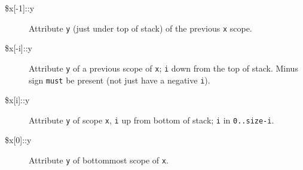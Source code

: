 \begin{description}
\item[\$x{[-1]}::y]
Attribute \verb=y= (just under top of stack) of the previous \verb=x= scope.

\item[\$x{[-i]}::y]
Attribute \verb=y= of a previous scope of \verb=x=;
\verb=i= down from the top of stack.
Minus sign \verb=must= be present (not just have a negative \verb=i=).

\item[\$x{[i]}::y]
Attribute \verb=y= of scope \verb=x=, \verb=i= up from bottom of stack;
\verb=i= in \verb=0..size-i=.

\item[\$x{[0]}::y]
Attribute \verb=y= of bottommost scope of \verb=x=.
\end{description}
